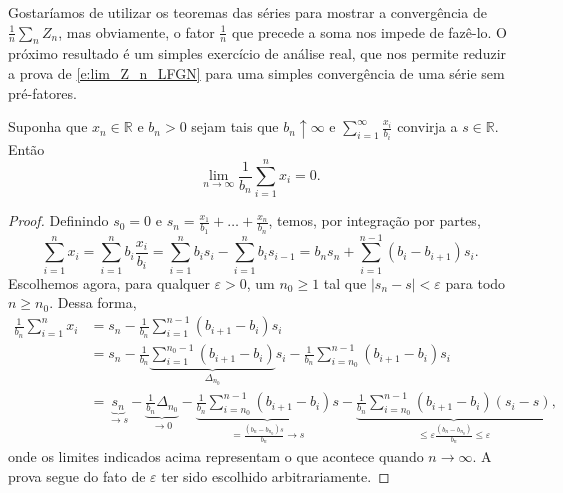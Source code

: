 \begin{topics}
Gostaríamos de utilizar os teoremas das séries para mostrar a convergência de $\tfrac 1n \sum_{n} Z_n$, mas obviamente, o fator $\tfrac 1n$ que precede a soma nos impede de fazê-lo.
O próximo resultado é um simples exercício de análise real, que nos permite reduzir a prova de \eqref{e:lim_Z_n_LFGN} para uma simples convergência de uma série sem pré-fatores.

\begin{lemma}
  Suponha que $x_n \in \mathbb{R}$ e $b_n > 0$ sejam tais que $b_n \uparrow \infty$ e $\sum_{i=1}^\infty \frac{x_i}{b_i}$ convirja a $s \in \mathbb{R}$.
  Então
  \begin{equation}
    \lim_{n \to \infty} \frac{1}{b_n} \sum_{i=1}^n x_i = 0.
  \end{equation}
\end{lemma}

\begin{proof}
  Definindo $s_0 = 0$ e $s_n = \tfrac{x_1}{b_1} + \dots + \tfrac{x_n}{b_n}$, temos, por integração por partes,
  \begin{equation}
    \sum_{i=1}^n x_i = \sum_{i=1}^n b_i \frac{x_i}{b_i} = \sum_{i=1}^n b_i s_{i} - \sum_{i=1}^n b_i s_{i-1} = b_n s_n + \sum_{i=1}^{n-1} (b_{i} - b_{i+1}) s_{i}.
  \end{equation}
  Escolhemos agora, para qualquer $\varepsilon > 0$, um $n_0 \geq 1$ tal que $|s_n - s| < \varepsilon$ para todo $n \geq n_0$.
  Dessa forma,
  \begin{equation*}
    \begin{split}
      \frac{1}{b_n} \sum_{i=1}^n x_i & = s_n - \frac{1}{b_n}\sum_{i=1}^{n-1} (b_{i+1} - b_{i}) s_{i}\\
      & = s_n - \frac{1}{b_n}\underbrace{\sum_{i=1}^{n_0-1} (b_{i+1} - b_{i})}_{\Delta_{n_0}} s_{i} - \frac{1}{b_n}\sum_{i=n_0}^{n-1} (b_{i+1} - b_{i}) s_{i}\\
      & = \underbrace{s_n}_{\to s} - \underbrace{\frac{1}{b_n}\Delta_{n_0}}_{\to 0} - \underbrace{\frac{1}{b_n}\sum_{i=n_0}^{n-1} (b_{i+1} - b_i) s}_{= \tfrac{(b_n - b_{n_0})s}{b_n} \to s} - \underbrace{\frac{1}{b_n}\sum_{i=n_0}^{n-1} (b_{i+1} - b_{i}) (s_{i} - s)}_{\leq \varepsilon\tfrac{(b_n - b_{n_0})}{b_n} \leq \varepsilon},
    \end{split}
  \end{equation*}
  onde os limites indicados acima representam o que acontece quando $n \to \infty$.
  A prova segue do fato de $\varepsilon$ ter sido escolhido arbitrariamente.
\end{proof}


\end{topics}
